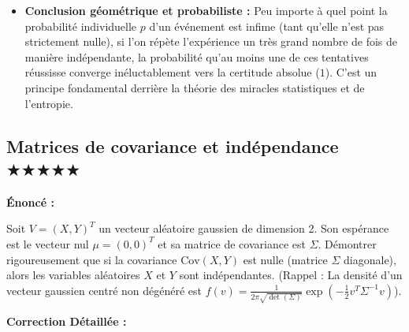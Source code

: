 \documentclass[11pt,a4paper]{article}
\begin{document}
\begin{itemize}
\item \textbf{Conclusion géométrique et probabiliste :} Peu importe à quel point la probabilité individuelle $p$ d'un événement est infime (tant qu'elle n'est pas strictement nulle), si l'on répète l'expérience un très grand nombre de fois de manière indépendante, la probabilité qu'au moins une de ces tentatives réussisse converge inéluctablement vers la certitude absolue ($1$). C'est un principe fondamental derrière la théorie des miracles statistiques et de l'entropie.
\end{itemize}

\subsection*{ Matrices de covariance et indépendance \quad $\bigstar\bigstar\bigstar\bigstar\bigstar$}

\textbf{Énoncé :}

Soit $V = (X, Y)^T$ un vecteur aléatoire gaussien de dimension 2. Son espérance est le vecteur nul $\mu = (0, 0)^T$ et sa matrice de covariance est $\Sigma$.
Démontrer rigoureusement que si la covariance $\text{Cov}(X,Y)$ est nulle (matrice $\Sigma$ diagonale), alors les variables aléatoires $X$ et $Y$ sont indépendantes.
(Rappel : La densité d'un vecteur gaussien centré non dégénéré est $f(v) = \frac{1}{2\pi \sqrt{\det(\Sigma)}} \exp\left(-\frac{1}{2} v^T \Sigma^{-1} v\right)$).

\textbf{Correction Détaillée :}
\end{document}
